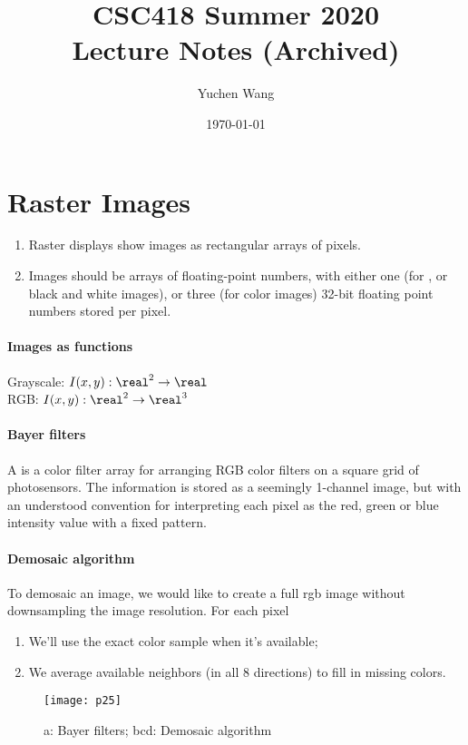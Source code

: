 \documentclass[11pt]{article}
\title{CSC418 Summer 2020\\ Lecture Notes (Archived)}
\author{Yuchen Wang}
\date{\today}
\numberwithin{equation}{section}
\begin{document}
    \maketitle
    \tableofcontents
    \newpage
\section{Raster Images}
\begin{enumerate}
	\item Raster displays show images as rectangular arrays of pixels.
	\item Images should be arrays of floating-point numbers, with either one (for , or black and white images), or three (for  color images) 32-bit floating point numbers stored per pixel.
\end{enumerate}

\paragraph{Images as functions}
Grayscale: $I(x, y): \real^2 \rightarrow \real$\\
RGB: $I(x, y): \real^2 \rightarrow \real^3$\\



\paragraph{Bayer filters}
A  is a color filter array for arranging RGB color filters on a square grid of photosensors. The information is stored as a seemingly 1-channel image, but with an understood convention for interpreting each pixel as the red, green or blue intensity value with a fixed pattern.
\paragraph{Demosaic algorithm}
To demosaic an image, we would like to create a full rgb image without downsampling the image resolution. For each pixel
\begin{enumerate}
	\item We'll use the exact color sample when it's available;
	\item We average available neighbors (in all 8 directions) to fill in missing colors.
\end{enumerate}

	\begin{figure}[H]
	\centering
	\texttt{[image: p25]}
	\caption{a: Bayer filters; bcd: Demosaic algorithm}
	\end{figure}
\end{document}
